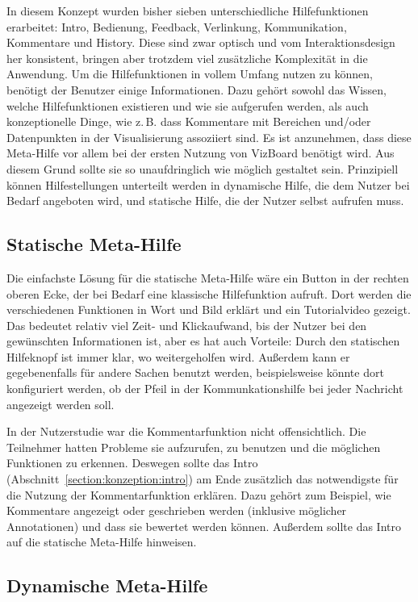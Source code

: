 \documentclass[
	headsepline,
	footsepline,
	fontsize=12pt,
	bibliography=totoc
]{scrbook}
\begin{document}
In diesem Konzept wurden bisher sieben unterschiedliche Hilfefunktionen erarbeitet: Intro, Bedienung, Feedback, Verlinkung, Kommunikation, Kommentare und History. Diese sind zwar optisch und vom Interaktionsdesign her konsistent, bringen aber trotzdem viel zusätzliche Komplexität in die Anwendung. Um die Hilfefunktionen in vollem Umfang nutzen zu können, benötigt der Benutzer einige Informationen. Dazu gehört sowohl das Wissen, welche Hilfefunktionen existieren und wie sie aufgerufen werden, als auch konzeptionelle Dinge, wie z.\,B. dass Kommentare mit Bereichen und/oder Datenpunkten in der Visualisierung assoziiert sind. Es ist anzunehmen, dass diese Meta-Hilfe vor allem bei der ersten Nutzung von VizBoard benötigt wird. Aus diesem Grund sollte sie so unaufdringlich wie möglich gestaltet sein. Prinzipiell können Hilfestellungen unterteilt werden in dynamische Hilfe, die dem Nutzer bei Bedarf angeboten wird, und statische Hilfe, die der Nutzer selbst aufrufen muss.

\subsection{Statische Meta-Hilfe}


Die einfachste Lösung für die statische Meta-Hilfe wäre ein Button in der rechten oberen Ecke, der bei Bedarf eine klassische Hilfefunktion aufruft. Dort werden die verschiedenen Funktionen in Wort und Bild erklärt und ein Tutorialvideo gezeigt. Das bedeutet relativ viel Zeit- und Klickaufwand, bis der Nutzer bei den gewünschten Informationen ist, aber es hat auch Vorteile: Durch den statischen Hilfeknopf ist immer klar, wo weitergeholfen wird. Außerdem kann er gegebenenfalls für andere Sachen benutzt werden, beispielsweise könnte dort konfiguriert werden, ob der Pfeil in der Kommunkationshilfe bei jeder Nachricht angezeigt werden soll.

In der Nutzerstudie war die Kommentarfunktion nicht offensichtlich. Die Teilnehmer hatten Probleme sie aufzurufen, zu benutzen und die möglichen Funktionen zu erkennen. Deswegen sollte das Intro (Abschnitt~\ref{section:konzeption:intro}) am Ende zusätzlich das notwendigste für die Nutzung der Kommentarfunktion erklären. Dazu gehört zum Beispiel, wie Kommentare angezeigt oder geschrieben werden (inklusive möglicher Annotationen) und dass sie bewertet werden können. Außerdem sollte das Intro auf die statische Meta-Hilfe hinweisen.

\subsection{Dynamische Meta-Hilfe}
\end{document}
